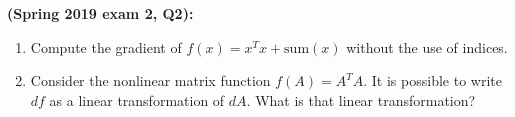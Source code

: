 \documentclass[11pt]{article}
\begin{document}
\newpage

\noindent \textbf{(Spring 2019 exam 2, Q2):}   
\begin{enumerate}
\item Compute the gradient of $f(x)=x^Tx+\text{sum}(x)$ without the use of indices.
\item Consider the nonlinear matrix function $f(A) = A^TA$. It is possible to write $df$ as a linear transformation of $dA$. What is that linear transformation?
\end{enumerate}
\end{document}
